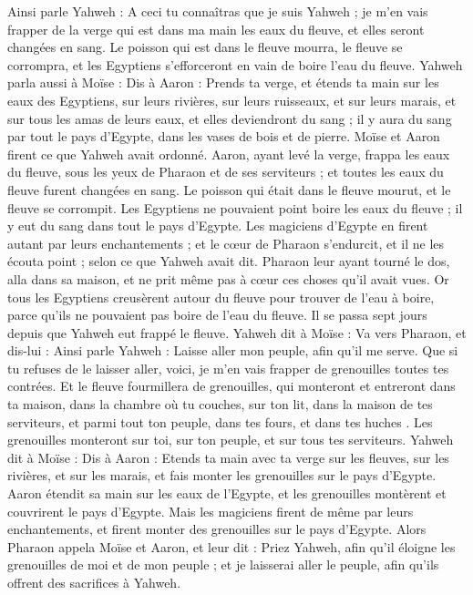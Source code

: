 \begin{multicols}{2}
Ainsi parle Yahweh : A ceci tu connaîtras que je suis Yahweh ; je m'en vais frapper de la verge qui est dans ma main les eaux du fleuve, et elles seront changées en sang.
Le poisson qui est dans le fleuve mourra, le fleuve se corrompra, et les Egyptiens s’efforceront en vain de boire l’eau du fleuve.
Yahweh parla aussi à Moïse : Dis à Aaron : Prends ta verge, et étends ta main sur les eaux des Egyptiens, sur leurs rivières, sur leurs ruisseaux, et sur leurs marais, et sur tous les amas de leurs eaux, et elles deviendront du sang ; il y aura du sang par tout le pays d'Egypte, dans les vases de bois et de pierre.
Moïse et Aaron firent ce que Yahweh avait ordonné. Aaron, ayant levé la verge, frappa les eaux du fleuve, sous les yeux de Pharaon et de ses serviteurs ; et toutes les eaux du fleuve furent changées en sang.
Le poisson qui était dans le fleuve mourut, et le fleuve se corrompit. Les Egyptiens ne pouvaient point boire les eaux du fleuve ; il y eut du sang dans tout le pays d'Egypte.
Les magiciens d'Egypte en firent autant par leurs enchantements ; et le cœur de Pharaon s'endurcit, et il ne les écouta point ; selon ce que Yahweh avait dit.
Pharaon leur ayant tourné le dos, alla dans sa maison, et ne prit même pas à cœur ces choses qu'il avait vues.
Or tous les Egyptiens creusèrent autour du fleuve pour trouver de l'eau à boire, parce qu'ils ne pouvaient pas boire de l'eau du fleuve.
Il se passa sept jours depuis que Yahweh eut frappé le fleuve.
Yahweh dit à Moïse : Va vers Pharaon, et dis-lui : Ainsi parle Yahweh : Laisse aller mon peuple, afin qu'il me serve.
Que si tu refuses de le laisser aller, voici, je m'en vais frapper de grenouilles toutes tes contrées.
Et le fleuve fourmillera de grenouilles, qui monteront et entreront dans ta maison, dans la chambre où tu couches, sur ton lit, dans la maison de tes serviteurs, et parmi tout ton peuple, dans tes fours, et dans tes huches .
Les grenouilles monteront sur toi, sur ton peuple, et sur tous tes serviteurs.
\VerseOne{}Yahweh dit à Moïse : Dis à Aaron : Etends ta main avec ta verge sur les fleuves, sur les rivières, et sur les marais, et fais monter les grenouilles sur le pays d'Egypte.
Aaron étendit sa main sur les eaux de l'Egypte, et les grenouilles montèrent et couvrirent le pays d'Egypte.
Mais les magiciens firent de même par leurs enchantements, et firent monter des grenouilles sur le pays d'Egypte.
Alors Pharaon appela Moïse et Aaron, et leur dit : Priez Yahweh, afin qu'il éloigne les grenouilles de moi et de mon peuple ; et je laisserai aller le peuple, afin qu'ils offrent des sacrifices à Yahweh.

\end{multicols}
